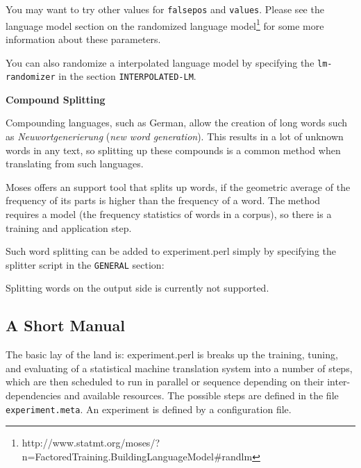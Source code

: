 You may want to try other values for {\tt falsepos} and {\tt values}. Please see the language model section on the randomized language model\footnote{\sf http://www.statmt.org/moses/?n=FactoredTraining.BuildingLanguageModel\#randlm} for some more information about these parameters.



You can also randomize a interpolated language model by specifying the {\tt lm-randomizer} in the section {\tt INTERPOLATED-LM}.



\vspace{2mm}

{\bf 
\label{experiment-perl.texntoc15}Compound Splitting}


Compounding languages, such as German, allow the creation of long words such as {\em Neuwortgenerierung} ({\em new word generation}). This results in a lot of unknown words in any text, so splitting up these compounds is a common method when translating from such languages.



Moses offers an support tool that splits up words, if the geometric average of the frequency of its parts is higher than the frequency of a word. The method requires a model (the frequency statistics of words in a corpus), so there is a training and application step.



Such word splitting can be added to experiment.perl simply by specifying the splitter script in the {\tt GENERAL} section:






\colorbox{gray}{%
}

Splitting words on the output side is currently not supported.



\subsection{
\label{experiment-perl.texntoc16}A Short Manual}


The basic lay of the land is: experiment.perl is breaks up the training, tuning, and evaluating of a statistical machine translation system into a number of steps, which are then scheduled to run in parallel or sequence depending on their inter-dependencies and available resources. The possible steps are defined in the file {\tt experiment.meta}. An experiment is defined by a configuration file.



